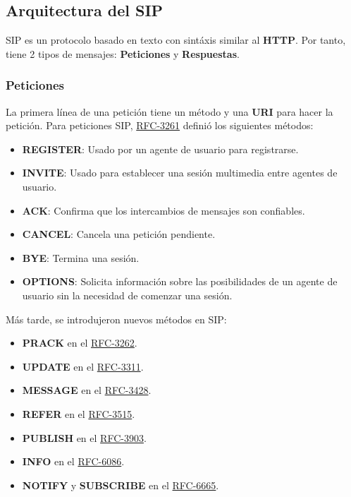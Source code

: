 \documentclass[a4paper, 11pt]{article} %
\newcommand{\RFC}[1]{\href{https://www.ietf.org/rfc/rfc#1.txt}{RFC-#1}}
\begin{document}
	\subsection{Arquitectura del SIP}
	SIP es un protocolo basado en texto con sintáxis similar al \textbf{HTTP}. Por tanto, tiene 2 tipos de mensajes: \textbf{Peticiones} y \textbf{Respuestas}.
		
		\subsubsection{Peticiones}
		La primera línea de una petición tiene un método y una \textbf{URI} para hacer la petición. Para peticiones SIP, \RFC{3261} definió los siguientes métodos:
		\begin{itemize}
			\item \textbf{REGISTER}: Usado por un agente de usuario para registrarse.
			\item \textbf{INVITE}: Usado para establecer una sesión multimedia entre agentes de usuario.
			\item \textbf{ACK}: Confirma que los intercambios de mensajes son confiables.
			\item \textbf{CANCEL}: Cancela una petición pendiente.
			\item \textbf{BYE}: Termina una sesión.
			\item \textbf{OPTIONS}: Solicita información sobre las posibilidades de un agente de usuario sin la necesidad de comenzar una sesión.
		\end{itemize}
		Más tarde, se introdujeron nuevos métodos en SIP:
		\begin{itemize}
			\item \textbf{PRACK} en el \RFC{3262}.
			\item \textbf{UPDATE} en el \RFC{3311}.
			\item \textbf{MESSAGE} en el \RFC{3428}.
			\item \textbf{REFER} en el \RFC{3515}.
			\item \textbf{PUBLISH} en el \RFC{3903}.
			\item \textbf{INFO} en el \RFC{6086}.
			\item \textbf{NOTIFY} y \textbf{SUBSCRIBE} en el \RFC{6665}.
		\end{itemize}
		
\end{document}
